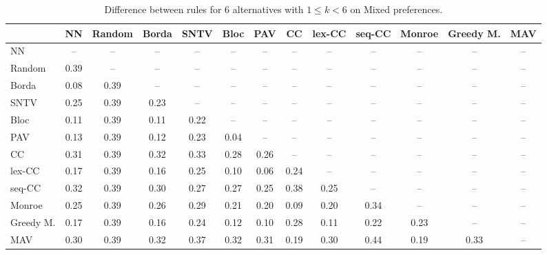 
\begin{table*}[htbp]
\centering
\begin{tabular}{lcccccccccccc}
\toprule
 & NN & Random & Borda & SNTV & Bloc & PAV & CC & lex-CC & seq-CC & Monroe & Greedy M. & MAV \\
\midrule
NN & -- & -- & -- & -- & -- & -- & -- & -- & -- & -- & -- & -- \\
Random & \cellcolor{blue!39} 0.39 & -- & -- & -- & -- & -- & -- & -- & -- & -- & -- & -- \\
Borda & \cellcolor{blue!8} 0.08 & \cellcolor{blue!39} 0.39 & -- & -- & -- & -- & -- & -- & -- & -- & -- & -- \\
SNTV & \cellcolor{blue!25} 0.25 & \cellcolor{blue!39} 0.39 & \cellcolor{blue!23} 0.23 & -- & -- & -- & -- & -- & -- & -- & -- & -- \\
Bloc & \cellcolor{blue!11} 0.11 & \cellcolor{blue!39} 0.39 & \cellcolor{blue!11} 0.11 & \cellcolor{blue!22} 0.22 & -- & -- & -- & -- & -- & -- & -- & -- \\
PAV & \cellcolor{blue!13} 0.13 & \cellcolor{blue!39} 0.39 & \cellcolor{blue!12} 0.12 & \cellcolor{blue!23} 0.23 & \cellcolor{blue!4} 0.04 & -- & -- & -- & -- & -- & -- & -- \\
CC & \cellcolor{blue!31} 0.31 & \cellcolor{blue!39} 0.39 & \cellcolor{blue!32} 0.32 & \cellcolor{blue!33} 0.33 & \cellcolor{blue!28} 0.28 & \cellcolor{blue!26} 0.26 & -- & -- & -- & -- & -- & -- \\
lex-CC & \cellcolor{blue!17} 0.17 & \cellcolor{blue!39} 0.39 & \cellcolor{blue!16} 0.16 & \cellcolor{blue!25} 0.25 & \cellcolor{blue!10} 0.10 & \cellcolor{blue!6} 0.06 & \cellcolor{blue!24} 0.24 & -- & -- & -- & -- & -- \\
seq-CC & \cellcolor{blue!32} 0.32 & \cellcolor{blue!39} 0.39 & \cellcolor{blue!30} 0.30 & \cellcolor{blue!27} 0.27 & \cellcolor{blue!27} 0.27 & \cellcolor{blue!25} 0.25 & \cellcolor{blue!38} 0.38 & \cellcolor{blue!25} 0.25 & -- & -- & -- & -- \\
Monroe & \cellcolor{blue!25} 0.25 & \cellcolor{blue!39} 0.39 & \cellcolor{blue!26} 0.26 & \cellcolor{blue!28} 0.29 & \cellcolor{blue!21} 0.21 & \cellcolor{blue!20} 0.20 & \cellcolor{blue!9} 0.09 & \cellcolor{blue!20} 0.20 & \cellcolor{blue!34} 0.34 & -- & -- & -- \\
Greedy M. & \cellcolor{blue!17} 0.17 & \cellcolor{blue!39} 0.39 & \cellcolor{blue!16} 0.16 & \cellcolor{blue!24} 0.24 & \cellcolor{blue!12} 0.12 & \cellcolor{blue!10} 0.10 & \cellcolor{blue!28} 0.28 & \cellcolor{blue!11} 0.11 & \cellcolor{blue!22} 0.22 & \cellcolor{blue!23} 0.23 & -- & -- \\
MAV & \cellcolor{blue!30} 0.30 & \cellcolor{blue!39} 0.39 & \cellcolor{blue!32} 0.32 & \cellcolor{blue!37} 0.37 & \cellcolor{blue!32} 0.32 & \cellcolor{blue!31} 0.31 & \cellcolor{blue!19} 0.19 & \cellcolor{blue!30} 0.30 & \cellcolor{blue!44} 0.44 & \cellcolor{blue!19} 0.19 & \cellcolor{blue!33} 0.33 & -- \\
\bottomrule
\end{tabular}

\caption{Difference between rules for 6 alternatives with $1 \leq k < 6$ on Mixed preferences.}
\label{tab:rule_distance_heatmap-m=[6]-pref_dist=mixed}
\end{table*}
    